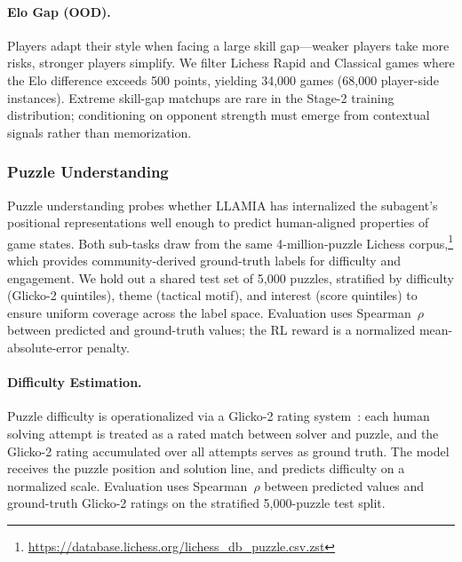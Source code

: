 \paragraph{Elo Gap (OOD).}
\label{sec:app_bench_bc_elo}
Players adapt their style when facing a large skill gap---weaker players take more risks, stronger players simplify. We filter Lichess Rapid and Classical games where the Elo difference exceeds 500 points, yielding 34,000 games (68,000 player-side instances). Extreme skill-gap matchups are rare in the Stage-2 training distribution; conditioning on opponent strength must emerge from contextual signals rather than memorization.

\subsubsection{Puzzle Understanding}
\label{sec:app_bench_puzzle}

Puzzle understanding probes whether LLAMIA has internalized the subagent's positional representations well enough to predict human-aligned properties of game states. Both sub-tasks draw from the same 4-million-puzzle Lichess corpus,\footnote{\url{https://database.lichess.org/lichess_db_puzzle.csv.zst}} which provides community-derived ground-truth labels for difficulty and engagement. We hold out a shared test set of 5,000 puzzles, stratified by difficulty (Glicko-2 quintiles), theme (tactical motif), and interest (score quintiles) to ensure uniform coverage across the label space. Evaluation uses Spearman~$\rho$ between predicted and ground-truth values; the RL reward is a normalized mean-absolute-error penalty.

\paragraph{Difficulty Estimation.}
\label{sec:app_bench_puzzle_diff}
Puzzle difficulty is operationalized via a Glicko-2 rating system~\citep{glickman2012example}: each human solving attempt is treated as a rated match between solver and puzzle, and the Glicko-2 rating accumulated over all attempts serves as ground truth. The model receives the puzzle position and solution line, and predicts difficulty on a normalized scale. Evaluation uses Spearman~$\rho$ between predicted values and ground-truth Glicko-2 ratings on the stratified 5,000-puzzle test split.

